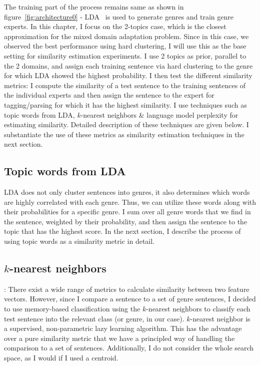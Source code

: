 The training part of the process remains same as shown in figure~\ref{fig:architecture0} - LDA~\citep{Blei:2012:PTM:2133806.2133826,Blei:2003:LDA:944919.944937} is used to generate genres and train genre experts. In this chapter, I focus on the 2-topics case, which is the closest approximation for the mixed domain adaptation problem. Since in this case, we observed the best performance using hard clustering, I will use this as the base setting for similarity estimation experiments. 
I use 2 topics as prior, parallel to the 2 domains, and assign each training sentence via hard clustering to the genre for which LDA showed the highest probability.%
I then test the different similarity metrics: I compute the similarity of a test sentence to the training sentences of the individual experts and then assign the sentence to the expert for tagging/parsing for which it has the highest similarity. I use techniques such as topic words from LDA, $k$-nearest neighbors \& language model perplexity for estimating similarity. Detailed description of these techniques are given below. I substantiate the use of these metrics as similarity estimation techniques in the next section.


	\subsection{ Topic words from LDA }
	
LDA does not only cluster sentences into genres, it also determines which words are highly correlated with each genre. Thus, we can utilize these words along with their probabilities for a specific genre. I sum over all genre words that we find in the sentence, weighted by their probability, and then assign the sentence to the topic that has the highest score. In the next section, I describe the process of using topic words as a similarity metric in detail.
	
	\subsection{ $k$-nearest neighbors}: There exist a wide range of metrics to calculate similarity between two feature vectors. However, since I compare a sentence to a set of genre sentences, I decided to use memory-based classification using the  $k$-nearest neighbors to classify each test sentence into the relevant class (or genre, in our case). $k$-nearest neighbor is a supervised, non-parametric lazy learning algorithm. This has the advantage over a pure similarity metric that we have a principled way of handling the comparison to a set of sentences. Additionally, I do not consider the whole search space, as I would if I used a centroid.
	

